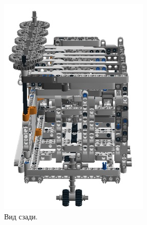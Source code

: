 \begin{figure}[h!]
\begin{minipage}[h!]{0.5\linewidth}
\begin{center}
			\includegraphics[width=1\linewidth]{chapters/chapter27/images/5}
			\caption{Вид сзади.}
			\label{ris:image27x5}
		\end{center}
	\end{minipage}
\end{figure}